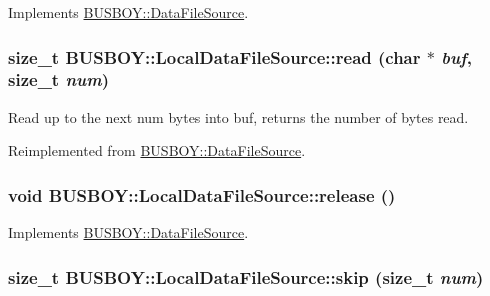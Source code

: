 Implements \hyperlink{classBUSBOY_1_1DataFileSource_afd39ef6968c00cc9202c01d68bc87709}{BUSBOY::DataFileSource}.\hypertarget{classBUSBOY_1_1LocalDataFileSource_af5b845f0dca80268e2d2d58fa101a38b}{
\subsubsection[{read}]{\setlength{\rightskip}{0pt plus 5cm}size\_\-t BUSBOY::LocalDataFileSource::read (char $\ast$ {\em buf}, \/  size\_\-t {\em num})}}
\label{classBUSBOY_1_1LocalDataFileSource_af5b845f0dca80268e2d2d58fa101a38b}


Read up to the next num bytes into buf, returns the number of bytes read. 

Reimplemented from \hyperlink{classBUSBOY_1_1DataFileSource_a7466bffda1100fb6f330382b4e491dd6}{BUSBOY::DataFileSource}.\hypertarget{classBUSBOY_1_1LocalDataFileSource_a6c452d0aa712dac330e68e4de6b77ce9}{
\subsubsection[{release}]{\setlength{\rightskip}{0pt plus 5cm}void BUSBOY::LocalDataFileSource::release ()}}
\label{classBUSBOY_1_1LocalDataFileSource_a6c452d0aa712dac330e68e4de6b77ce9}


Implements \hyperlink{classBUSBOY_1_1DataFileSource_a9f78f31eddcf41fd393e99ee00278d09}{BUSBOY::DataFileSource}.\hypertarget{classBUSBOY_1_1LocalDataFileSource_afe40ac6d9ab78d27b52be6ba234849d4}{
\subsubsection[{skip}]{\setlength{\rightskip}{0pt plus 5cm}size\_\-t BUSBOY::LocalDataFileSource::skip (size\_\-t {\em num})}}
\label{classBUSBOY_1_1LocalDataFileSource_afe40ac6d9ab78d27b52be6ba234849d4}


